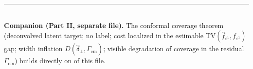 \documentclass[11pt]{article}
\theoremstyle{definition}
\newcommand{\Gcm}{\Gamma_{\mathrm{cm}}}
\newcommand{\TV}{\mathrm{TV}}
\begin{document}
\normalsize
\vspace{1em}
\noindent\rule{\linewidth}{0.4pt}\\[2pt]
\textbf{Companion (Part II, separate file).} The conformal coverage theorem
(deconvolved latent target; no label; cost localized in the estimable
$\TV(\widehat f_{\varepsilon^1},f_{\varepsilon^1})$ gap; width inflation
$D(\widehat\delta_\perp,\Gcm)$; visible degradation of coverage in the residual
$\Gcm$) builds directly on 
of this file.
\end{document}
